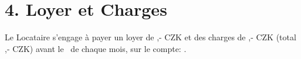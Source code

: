 \section*{4. Loyer et Charges}
Le Locataire s'engage à payer un loyer de \Rentrentamount,- CZK et des charges de \Rentservicesamount,- CZK (total \Renttotalamount,- CZK) avant le \Rentpaymentday\ de chaque mois, sur le compte: \Rentbankaccount.
